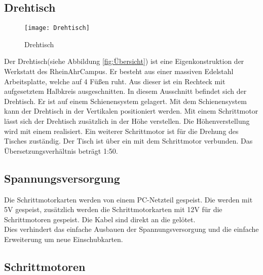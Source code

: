 \subsection{Drehtisch}
\label{sec:Drehtisch}
\begin{figure}[htb]
\centering
\texttt{[image: Drehtisch]}
\caption{Drehtisch}
\label{fig:Drehtisch}
\end{figure}
Der Drehtisch(siehe Abbildung \ref{fig:Übersicht}) ist eine Eigenkonstruktion der Werkstatt des RheinAhrCampus. Er besteht aus einer massiven Edelstahl Arbeitsplatte, welche auf 4 Füßen ruht. Aus dieser ist ein Rechteck mit aufgesetztem Halbkreis ausgeschnitten. In diesem Ausschnitt befindet sich der Drehtisch. Er ist auf einem Schienensystem gelagert. Mit dem Schienensystem kann der Drehtisch in der Vertikalen positioniert werden. Mit einem Schrittmotor lässt sich der Drehtisch zusätzlich in der Höhe verstellen. Die Höhenverstellung wird mit einem  realisiert. Ein weiterer Schrittmotor ist für die Drehung des Tisches zuständig. Der Tisch ist über ein  mit dem Schrittmotor verbunden. Das Übersetzungsverhältnis beträgt 1:50.  
 
\subsection{Spannungsversorgung}
\label{sec:Spannungsv}
Die Schrittmotorkarten werden von einem PC-Netzteil gespeist. Die  werden mit 5V gespeist, zusätzlich werden die Schrittmotorkarten mit 12V für die Schrittmotoren gespeist. Die Kabel sind direkt an die  gelötet.\\
Dies verhindert das einfache Ausbauen der Spannungsversorgung und die einfache Erweiterung um neue Einschubkarten.
\subsection{Schrittmotoren}
\label{sec:Schrittmotoren}
\\

